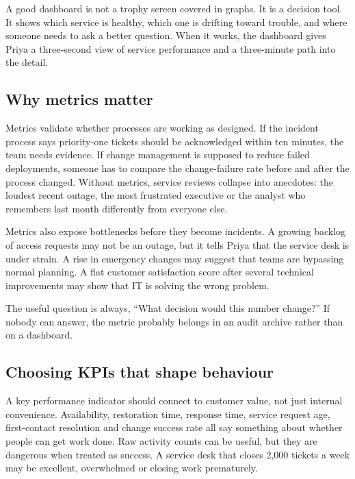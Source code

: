 A good dashboard is not a trophy screen covered in graphs. It is a decision tool. It shows which service is healthy, which one is drifting toward trouble, and where someone needs to ask a better question. When it works, the dashboard gives Priya a three-second view of service performance and a three-minute path into the detail.



\subsection{Why metrics matter}


Metrics validate whether processes are working as designed. If the incident process says priority-one tickets should be acknowledged within ten minutes, the team needs evidence. If change management is supposed to reduce failed deployments, someone has to compare the change-failure rate before and after the process changed. Without metrics, service reviews collapse into anecdotes: the loudest recent outage, the most frustrated executive or the analyst who remembers last month differently from everyone else.


Metrics also expose bottlenecks before they become incidents. A growing backlog of access requests may not be an outage, but it tells Priya that the service desk is under strain. A rise in emergency changes may suggest that teams are bypassing normal planning. A flat customer satisfaction score after several technical improvements may show that IT is solving the wrong problem.


The useful question is always, ``What decision would this number change?'' If nobody can answer, the metric probably belongs in an audit archive rather than on a dashboard.



\subsection{Choosing KPIs that shape behaviour}


A key performance indicator should connect to customer value, not just internal convenience. Availability, restoration time, response time, service request age, first-contact resolution and change success rate all say something about whether people can get work done. Raw activity counts can be useful, but they are dangerous when treated as success. A service desk that closes 2,000 tickets a week may be excellent, overwhelmed or closing work prematurely.


